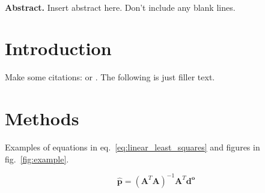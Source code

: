 \documentclass[9pt,twocolumn]{paper}
\begin{document}
\thispagestyle{plain}
\twocolumn[
  \begin{@twocolumnfalse}
    \noindent \textbf{\Large \Title{}}
  \end{@twocolumnfalse}
  \vspace{0.7cm}
]
\noindent {\large \Name{}}
\\[0.2cm]
\noindent {\small \Affiliation{}}
\vspace{0.5cm}

\noindent
\textbf{Abstract.}
Insert abstract here. Don't include any blank lines.
\lipsum[1]

\section{Introduction}

Make some citations: \cite{Parker1973} or \citep{Parker1973}.
The following is just filler text.
\lipsum[1-4]


\section{Methods}

Examples of equations in eq.~\ref{eq:linear_least_squares} and figures in
fig.~\ref{fig:example}.

\begin{equation}
  \mathbf{\hat{p}} =
    \left(\mathbf{A}^T\mathbf{A}\right)^{-1}
    \mathbf{A}^T\mathbf{d^o}
  \label{eq:linear_least_squares}
\end{equation}
\end{document}
